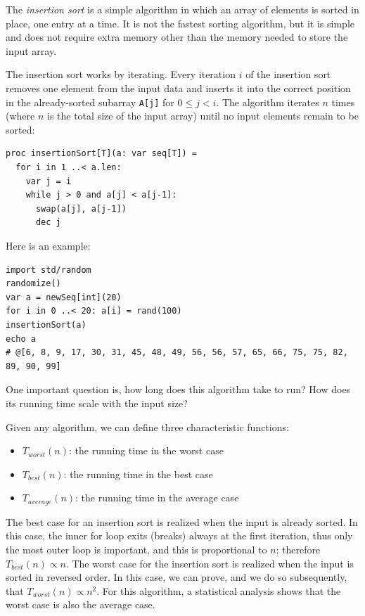 \documentclass[justified, sixbynine]{tufte-book}
\def\ft{\small\tt}
\theoremstyle{plain}%
\newtheorem * {corollary}{Corollary}
\theoremstyle{definition}
\theoremstyle{remark}
\newtheorem * {remark}{Remark}
\newtheorem * {note}{Note}
\begin{document}
\begin{fullwidth}
\index{$\Theta$}\index{$\Omega$}\index{$\omega$}


The {\it insertion sort} is a simple algorithm in which an array of elements is sorted in place, one entry at a time. It is not the fastest sorting algorithm, but it is simple and does not require extra memory other than the memory needed to store the input array.

The insertion sort works by iterating. Every iteration $i$ of the insertion sort removes one element from the input data and inserts it into the correct position in the already-sorted subarray {\ft A[j]} for $0 \le j < i$. The algorithm iterates $n$ times (where $n$ is the total size of the input array) until no input elements remain to be sorted:

\begin{lstlisting}
proc insertionSort[T](a: var seq[T]) =
  for i in 1 ..< a.len:
    var j = i
    while j > 0 and a[j] < a[j-1]:
      swap(a[j], a[j-1])
      dec j
\end{lstlisting}

Here is an example:

\begin{lstlisting}
import std/random
randomize()
var a = newSeq[int](20)
for i in 0 ..< 20: a[i] = rand(100)
insertionSort(a)
echo a
# @[6, 8, 9, 17, 30, 31, 45, 48, 49, 56, 56, 57, 65, 66, 75, 75, 82, 89, 90, 99]
\end{lstlisting}

One important question is, how long does this algorithm take to run? How does its running time scale with the input size?

Given any algorithm, we can define three characteristic functions:

\begin{itemize}
\item  $T_{worst}(n)$: the running time in the worst case

\item  $T_{best}(n)$: the running time in the best case

\item  $T_{average}(n)$: the running time in the average case
\end{itemize}

The best case for an insertion sort is realized when the input is already sorted. In this case, the inner for loop exits (breaks) always at the first iteration, thus only the most outer loop is important, and this is proportional to $n$; therefore $T_{best}(n) \propto n$. The worst case for the insertion sort is realized when the input is sorted in reversed order. In this case, we can prove, and we do so subsequently, that $T_{worst}(n) \propto n^2$. For this algorithm, a statistical analysis shows that the worst case is also the average case.


\end{fullwidth}
\end{document}
